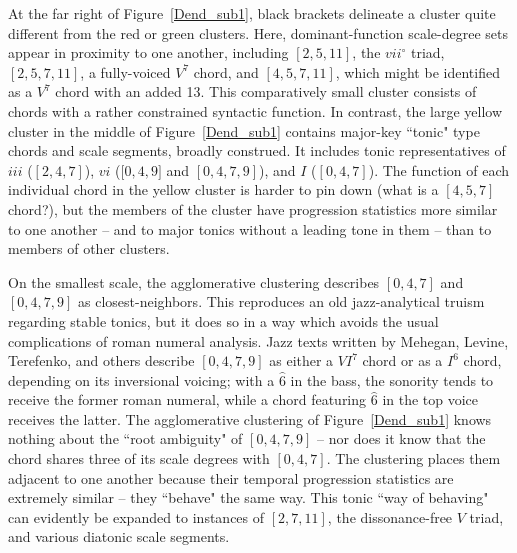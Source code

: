 At the far right of Figure~\ref{Dend_sub1}, black brackets delineate a cluster quite different from the red or green clusters.  Here, dominant-function scale-degree sets appear in proximity to one another, including $[2,5,11]$, the $vii^{\circ}$ triad, $[2,5,7,11]$, a fully-voiced $V^7$ chord, and $[4,5,7,11]$, which might be identified as a $V^7$ chord with an added 13.  This comparatively small cluster consists of chords with a rather constrained syntactic function.  In contrast, the large yellow cluster in the middle of Figure~\ref{Dend_sub1} contains major-key ``tonic" type chords and scale segments, broadly construed.  It includes tonic representatives of $iii$ ($[2,4,7]$), $vi$ ([$0,4,9]$ and $[0,4,7,9]$), and $I$ ($[0,4,7]$).  The function of each individual chord in the yellow cluster is harder to pin down (what is a $[4,5,7]$ chord?), but the members of the cluster have progression statistics more similar to one another -- and to major tonics without a leading tone in them -- than to members of other clusters.

On the smallest scale, the agglomerative clustering describes $[0,4,7]$ and $[0,4,7,9]$ as closest-neighbors.  This reproduces an old jazz-analytical truism regarding stable tonics, but it does so in a way which avoids the usual complications of roman numeral analysis.  Jazz texts written by Mehegan, Levine, Terefenko, and others describe $[0,4,7,9]$ as either a $VI^7$ chord or as a $I^6$ chord, depending on its inversional voicing; with a $\hat{6}$ in the bass, the sonority tends to receive the former roman numeral, while a chord featuring $\hat{6}$ in the top voice receives the latter.  The agglomerative clustering of Figure~\ref{Dend_sub1} knows nothing about the ``root ambiguity" of $[0,4,7,9]$ -- nor does it know that the chord shares three of its scale degrees with $[0,4,7]$.  The clustering places them adjacent to one another because their temporal progression statistics are extremely similar -- they ``behave" the same way.  This tonic ``way of behaving" can evidently be expanded to instances of $[2,7,11]$, the dissonance-free $V$ triad, and various diatonic scale segments. 


